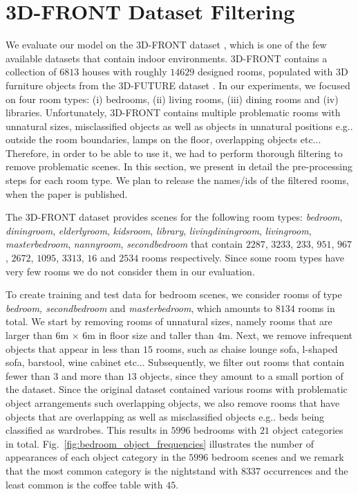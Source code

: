 \documentclass{article}
\makeatletter
\DeclareRobustCommand\onedot{\futurelet\@let@token\@onedot}
\def\@onedot{\ifx\@let@token.\else.\null\fi\xspace}
\def\eg{e.g\onedot} \def\Eg{E.g\onedot}
\def\etc{etc\onedot}
\newcommand{\boldparagraph}[1]{\vspace{0.2cm}\noindent{\bf #1:} }
\newcommand{\figref}[1]{Fig.~\ref{#1}}
\makeatother
\begin{document}
\section{3D-FRONT Dataset Filtering}
\label{sec:3d_front_filtering}

We evaluate our model on the 3D-FRONT dataset \cite{Fu2020ARXIVa},
which is one of the few available datasets that contain indoor environments.
3D-FRONT contains a collection
of $6813$ houses with roughly $14629$ designed rooms,
populated with 3D furniture objects from the 3D-FUTURE dataset
\cite{Fu2020ARXIVb}. In our experiments, we focused on four room types: (i)
bedrooms, (ii) living rooms, (iii) dining rooms and (iv) libraries.
Unfortunately, 3D-FRONT contains multiple problematic rooms with unnatural
sizes, misclassified objects as well as objects in unnatural positions \eg
outside the room boundaries, lamps on the floor, overlapping objects \etc.
Therefore, in order to be able to use it, we had to perform thorough filtering
to remove problematic scenes. In this section, we present in detail the
pre-processing steps for each room type. We plan to release the names/ids of
the filtered rooms, when the paper is published.

The 3D-FRONT dataset provides scenes for the following room types: \emph{bedroom},
\emph{diningroom}, \emph{elderlyroom}, \emph{kidsroom}, \emph{library},
\emph{livingdiningroom}, \emph{livingroom}, \emph{masterbedroom},
\emph{nannyroom}, \emph{secondbedroom} that contain $2287$, $3233$, $233$,
$951$, $967$, $2672$, $1095$, $3313$, $16$ and $2534$ rooms respectively. Since
some room types have very few rooms we do not consider them in our evaluation.

\boldparagraph{Bedroom}To create training and test data for bedroom scenes, we consider rooms of type
\emph{bedroom, secondbedroom} and \emph{masterbedroom}, which amounts to $8134$
rooms in total. We start by removing rooms of unnatural sizes, namely rooms
that are larger than $6$m $\times$ $6$m in floor size and taller than $4$m.
Next, we remove infrequent objects that appear in less than $15$ rooms, such as
chaise lounge sofa, l-shaped sofa, barstool, wine cabinet \etc.  Subsequently,
we filter out rooms that contain fewer than $3$ and more than $13$ objects,
since they amount to a small portion of the dataset.  Since the original
dataset contained various rooms with problematic object arrangements such
overlapping objects, we also remove rooms that have objects that are
overlapping as well as misclassified objects \eg beds being classified as
wardrobes. This results in $5996$ bedrooms with $21$ object categories in
total. \figref{fig:bedroom_object_frequencies} illustrates the
number of appearances of each object category in the $5996$ bedroom scenes and
we remark that the most common category is the nightstand with $8337$
occurrences and the least common is the coffee table with $45$.
\end{document}
